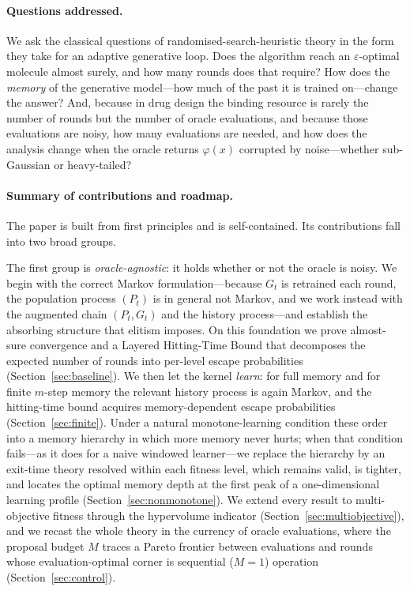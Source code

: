 \documentclass[11pt,a4paper]{article}
\begin{document}
\paragraph{Questions addressed.}
We ask the classical questions of randomised-search-heuristic theory in the
form they take for an adaptive generative loop.  Does the algorithm reach an
$\varepsilon$-optimal molecule almost surely, and how many rounds does that
require?  How does the \emph{memory} of the generative model---how much of
the past it is trained on---change the answer?  And, because in drug design
the binding resource is rarely the number of rounds but the number of oracle
evaluations, and because those evaluations are noisy, how many evaluations
are needed, and how does the analysis change when the oracle returns
$\varphi(x)$ corrupted by noise---whether sub-Gaussian or heavy-tailed?

\paragraph{Summary of contributions and roadmap.}
The paper is built from first principles and is self-contained.  Its
contributions fall into two broad groups.

The first group is \emph{oracle-agnostic}: it holds whether or not the
oracle is noisy.  We begin with the correct Markov formulation---because
$G_t$ is retrained each round, the population process $(P_t)$ is in general
not Markov, and we work instead with the augmented chain $(P_t,G_t)$ and
the history process---and establish the absorbing structure that elitism
imposes.  On this foundation we prove almost-sure convergence and a Layered
Hitting-Time Bound that decomposes the expected number of rounds into
per-level escape probabilities (Section~\ref{sec:baseline}).  We then let
the kernel \emph{learn}: for full memory and for finite $m$-step memory the
relevant history process is again Markov, and the hitting-time bound
acquires memory-dependent escape probabilities (Section~\ref{sec:finite}).
Under a natural monotone-learning condition these order into a memory
hierarchy in which more memory never hurts; when that condition fails---as
it does for a naive windowed learner---we replace the hierarchy by an
exit-time theory resolved within each fitness level, which remains valid, is
tighter, and locates the optimal memory depth at the first peak of a
one-dimensional learning profile (Section~\ref{sec:nonmonotone}).  We extend
every result to multi-objective fitness through the hypervolume indicator
(Section~\ref{sec:multiobjective}), and we recast the whole theory in the
currency of oracle evaluations, where the proposal budget $M$ traces a
Pareto frontier between evaluations and rounds whose evaluation-optimal
corner is sequential ($M=1$) operation (Section~\ref{sec:control}).
\end{document}
